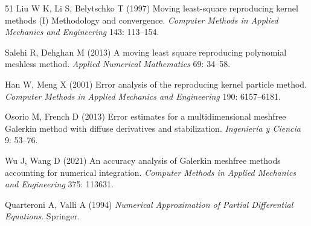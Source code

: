 \begin{thebibliography}{51}
 Liu W K, Li S, Belytschko T (1997) Moving least-square reproducing kernel methods ({I}) {Methodology} and convergence. \emph{Computer Methods in Applied Mechanics and Engineering} 143: 113--154.

 Salehi R, Dehghan M (2013) A moving least square reproducing polynomial meshless method. \emph{Applied Numerical Mathematics} 69: 34--58.

 Han W, Meng X (2001) Error analysis of the reproducing kernel particle method. \emph{Computer Methods in Applied Mechanics and Engineering} 190: 6157--6181.

 Osorio M, French D (2013) Error estimates for a multidimensional meshfree {Galerkin} method with diffuse derivatives and stabilization. \emph{Ingenier{\'i}a y Ciencia} 9: 53--76.

 Wu J, Wang D (2021) An accuracy analysis of {Galerkin} meshfree methods accounting for numerical integration. \emph{Computer Methods in Applied Mechanics and Engineering} 375: 113631.

 Quarteroni A, Valli A (1994) \emph{Numerical Approximation of Partial Differential Equations}. Springer.

\end{thebibliography}
